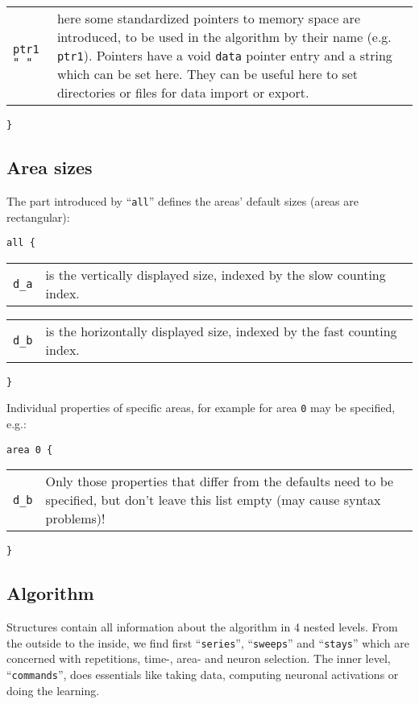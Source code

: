 \documentclass[12pt]{article}
\begin{document}
\begin{tabular}{p{2.25cm}p{12.75cm}}
\texttt{ptr1 " "} &
  here some standardized pointers to memory space are introduced, to be used in the algorithm by their name (e.g. \texttt{ptr1}).
  Pointers have a void \texttt{data} pointer entry and a string which can be set here.
  They can be useful here to set directories or files for data import or export.\\
\end{tabular}
\texttt{\}}


\subsection{Area sizes}

The part introduced by ``\texttt{all}'' defines the areas' default sizes (areas are rectangular):

\texttt{all \{} \\
\begin{tabular}{p{2.25cm}p{12.75cm}}
\texttt{d\_a} &
  is the vertically displayed size, indexed by the slow counting index.\\
\end{tabular}
\begin{tabular}{p{2.25cm}p{12.75cm}}
\texttt{d\_b} &
  is the horizontally displayed size, indexed by the fast counting index.\\
\end{tabular}
\texttt{\}}

Individual properties of specific areas, for example for area \texttt{0} may be specified, e.g.:

\texttt{area 0 \{} \\
\begin{tabular}{p{2.25cm}p{12.75cm}}
\texttt{d\_b} &
Only those properties that differ from the defaults need to be specified,
but don't leave this list empty (may cause syntax problems)!
\end{tabular}
\texttt{\}}


\subsection{Algorithm}

Structures contain all information about the algorithm in 4 nested levels.
From the outside to the inside, we find first ``\texttt{series}'', ``\texttt{sweeps}'' and ``\texttt{stays}'' which are concerned with repetitions, time-, area- and neuron selection.
The inner level, ``\texttt{commands}'', does essentials like taking data, computing neuronal activations or doing the learning.
\end{document}
